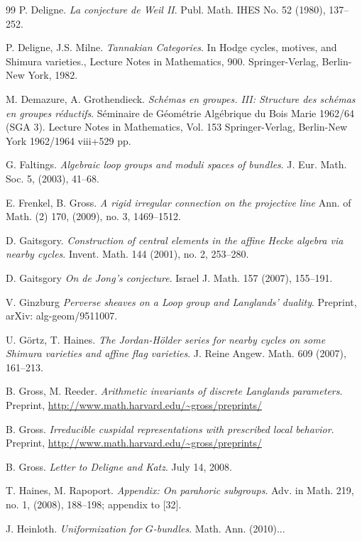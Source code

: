 \begin{thebibliography}{99}
 P. Deligne. \emph{La conjecture de Weil II}. Publ. Math. IHES No. 52 (1980), 137--252.

 P. Deligne, J.S. Milne. \emph{Tannakian Categories}. In Hodge cycles, motives, and Shimura varieties., Lecture Notes in Mathematics, 900. Springer-Verlag, Berlin-New York, 1982.

 M. Demazure, A. Grothendieck. \emph{Schémas en groupes. III: Structure des schémas en groupes réductifs}. Séminaire de Géométrie Algébrique du Bois Marie 1962/64 (SGA 3). Lecture Notes in Mathematics, Vol. 153 Springer-Verlag, Berlin-New York 1962/1964 viii+529 pp.

 G. Faltings. \emph{Algebraic loop groups and moduli spaces of bundles}. J. Eur. Math. Soc. 5, (2003), 41--68.

 E. Frenkel, B. Gross. \emph{A rigid irregular connection on the projective line} Ann. of Math. (2) 170, (2009), no. 3, 1469--1512.

 D. Gaitsgory. \emph{Construction of central elements in the affine Hecke algebra via nearby cycles}. Invent. Math. 144 (2001), no. 2, 253--280.

 D. Gaitsgory \emph{On de Jong's conjecture}. Israel J. Math. 157 (2007), 155--191.

 V. Ginzburg \emph{Perverse sheaves on a Loop group and Langlands' duality}. Preprint, arXiv: alg-geom/9511007.

 U. Görtz, T. Haines. \emph{The Jordan-Hölder series for nearby cycles on some Shimura varieties and affine flag varieties}. J. Reine Angew. Math. 609 (2007), 161--213.

 B. Gross, M. Reeder. \emph{Arithmetic invariants of discrete Langlands parameters}. Preprint, \url{http://www.math.harvard.edu/~gross/preprints/}

 B. Gross. \emph{Irreducible cuspidal representations with prescribed local behavior}. Preprint, \url{http://www.math.harvard.edu/~gross/preprints/}

 B. Gross. \emph{Letter to Deligne and Katz}. July 14, 2008.

 T. Haines, M. Rapoport. \emph{Appendix: On parahoric subgroups}. Adv. in Math. 219, no. 1, (2008), 188--198; appendix to [32].

 J. Heinloth. \emph{Uniformization for $G$-bundles}. Math. Ann. (2010)...


\end{thebibliography}
